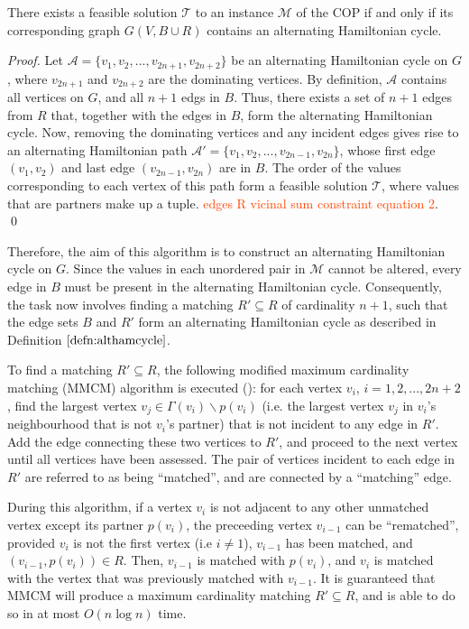 \documentclass[oribibl]{llncs}
\begin{document}
\begin{theorem}
	\label{thm:cpopsoln}
	There exists a feasible solution $\mathcal{T}$ to an instance $\mathcal{M}$ of the COP if and only if its corresponding graph $G(V, B\cup R)$ contains an alternating Hamiltonian cycle.
\end{theorem}
\begin{proof}
	Let $\mathcal{A} = \{v_1, v_2, ..., v_{2n+1}, v_{2n+2}\}$ be an alternating Hamiltonian cycle on $G$, where $v_{2n+1}$ and $v_{2n+2}$ are the dominating vertices. By definition, $\mathcal{A}$ contains all vertices on $G$, and all $n+1$ edgs in $B$. Thus, there exists a set of $n+1$ edges from $R$ that, together with the edges in $B$, form the alternating Hamiltonian cycle. Now, removing the dominating vertices and any incident edges gives rise to an alternating Hamiltonian path $\mathcal{A}' = \{v_1, v_2, ..., v_{2n-1}, v_{2n}\}$, whose first edge $(v_1, v_2)$ and last edge $(v_{2n-1}, v_{2n})$ are in $B$. The order of the values corresponding to each vertex of this path form a feasible solution $\mathcal{T}$, where values that are partners make up a tuple. \textcolor{OrangeRed}{edges R vicinal sum constraint equation 2}. \qed
\end{proof}

Therefore, the aim of this algorithm is to construct an alternating Hamiltonian cycle on $G$. Since the values in each unordered pair in $\mathcal{M}$ cannot be altered, every edge in $B$ must be present in the alternating Hamiltonian cycle. Consequently, the task now involves finding a matching $R' \subseteq R$ of cardinality $n+1$, such that the edge sets $B$ and $R'$ form an alternating Hamiltonian cycle as described in Definition $\ref{defn:althamcycle}$.  


To find a matching $R' \subseteq R$, the following modified maximum cardinality matching (MMCM) algorithm is executed (\citealp{mahadev1994, becker2010}): for each vertex $v_i$, $i = 1, 2,...,2n+2$, find the largest vertex $v_j \in \Gamma(v_i)\backslash p(v_i)$ (i.e. the largest vertex $v_j$ in $v_i$'s neighbourhood that is not $v_i$'s partner) that is not incident to any edge in $R'$. Add the edge connecting these two vertices to $R'$, and proceed to the next vertex until all vertices have been assessed. The pair of vertices incident to each edge in $R'$ are referred to as being ``matched'', and are connected by a ``matching'' edge. 

During this algorithm, if a vertex $v_i$ is not adjacent to any other unmatched vertex except its partner $p(v_i)$, the preceeding vertex $v_{i-1}$ can be ``rematched'', provided $v_i$ is not the first vertex (i.e $i \neq 1$), $v_{i-1}$ has been matched, and $(v_{i-1}, p(v_i)) \in R$. Then, $v_{i-1}$ is matched with $p(v_i)$, and $v_i$ is matched with the vertex that was previously matched with $v_{i-1}$. It is guaranteed that MMCM will produce a maximum cardinality matching $R' \subseteq R$, and is able to do so in at most $O(n \log n)$ time.
\end{document}
